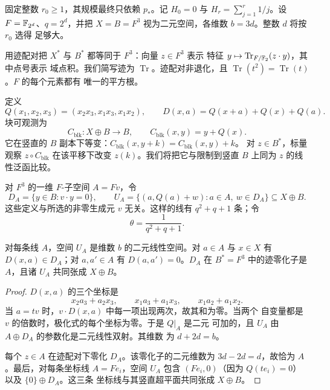 固定整数 $r_0\ge1$，其规模最终只依赖 $p_*$。记 $H_0=0$ 与
$H_r=\sum_{j=1}^r 1/j$。设 $F=\mathbb F_{2^d}$、$q=2^d$，并把
$X=B=F^3$ 视为二元空间，各维数 $b=3d$。整数 $d$ 将按 $r_0$ 选得
足够大。

用迹配对把 $X^*$ 与 $B^*$ 都等同于 $F^3$：向量 $z\in F^3$ 表示
特征 $y\mapsto\operatorname{Tr}_{F/\mathbb F_2}(z\cdot y)$，其中点号表示
域点积。我们简写迹为 $\operatorname{Tr}$。迹配对非退化，且
$\operatorname{Tr}(t^2)=\operatorname{Tr}(t)$。$F$ 的每个元素都有
唯一的平方根。

定义
\begin{equation}\label{eq:latent-quadratic}
 Q(x_1,x_2,x_3)=(x_2x_3,x_1x_3,x_1x_2),
 \qquad
 D(x,a)=Q(x+a)+Q(x)+Q(a).
\end{equation}
块可观测为
\[
 C_{\mathrm{blk}}:X\oplus B\longrightarrow B,
 \qquad C_{\mathrm{blk}}(x,y)=y+Q(x).
\]
它在竖直的 $B$ 副本下等变：$C_{\mathrm{blk}}(x,y+k)=C_{\mathrm{blk}}(x,y)+k$。
对 $z\in B^*$，标量观察 $z\circ C_{\mathrm{blk}}$ 在该平移下改变
$z(k)$。我们将把它与限制到竖直 $B$ 上同为 $z$ 的线性泛函比较。

对 $F^3$ 的一维 $F$-子空间 $A=Fv$，令
\begin{equation}\label{eq:latent-block-subspaces}
 D_A=\{y\in B:v\cdot y=0\},
 \qquad
 U_A=\{(a,Q(a)+w):a\in A,\ w\in D_A\}\subseteq X\oplus B.
\end{equation}
这些定义与所选的非零生成元 $v$ 无关。这样的线有 $q^2+q+1$ 条；令
\begin{equation}\label{eq:latent-theta}
 \theta=\frac{1}{q^2+q+1}.
\end{equation}

\begin{lemma}\label{lem:latent-block}
对每条线 $A$，空间 $U_A$ 是维数 $b$ 的二元线性空间。对
$a\in A$ 与 $x\in X$ 有 $D(x,a)\in D_A$；对 $a,a'\in A$ 有
$D(a,a')=0$。$D_A$ 在 $B^*=F^3$ 中的迹零化子是 $A$，且诸 $U_A$
共同张成 $X\oplus B$。
\end{lemma}

\begin{proof}
$D(x,a)$ 的三个坐标是
\[
 x_2a_3+a_2x_3,\qquad
 x_1a_3+a_1x_3,\qquad
 x_1a_2+a_1x_2.
\]
当 $a=tv$ 时，$v\cdot D(x,a)$ 中每一项出现两次，故其和为零。当两个
自变量都是 $v$ 的倍数时，极化式的每个坐标为零。于是 $Q|_A$ 是二元
可加的，且 $U_A$ 由 $A\oplus D_A$ 的参数化是二元线性双射。其维数
为 $d+2d=b$。

每个 $z\in A$ 在迹配对下零化 $D_A$。该零化子的二元维数为
$3d-2d=d$，故恰为 $A$。最后，对每条坐标线 $A=Fe_i$，空间 $U_A$
包含 $(Fe_i,0)$（因为 $Q(te_i)=0$）以及 $\{0\}\oplus D_A$。这三条
坐标线与其竖直超平面共同张成 $X\oplus B$。
\end{proof}

